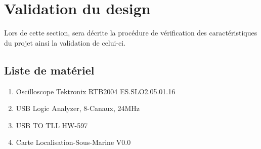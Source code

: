 \section{Validation du design}
Lors de cette section, sera décrite la procédure de vérification des caractéristiques du projet ainsi la validation de celui-ci.
\subsection{Liste de matériel} \label{ssec:ListeMateriel}
{
	\begin{enumerate}
		\item Oscilloscope Tektronix RTB2004 ES.SLO2.05.01.16 \label{enum:oscillo}
		\item USB Logic Analyzer, 8-Canaux, 24MHz \label{enum:logicAnalyzer}
		\item USB TO TLL HW-597 \label{enum:USB-TTL}
		\item Carte Localisation-Sous-Marine V0.0 \label{enum:PCBL}
	\end{enumerate}
}

